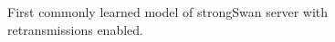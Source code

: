 \begin{figure}[ht]
	\vspace*{\fill}
	\noindent
	\hspace*{-5.5\oddsidemargin}%
	\caption{First commonly learned model of strongSwan server with retransmissions enabled.}
	\label{fig:ret_case1}
	\vspace*{\fill}
\end{figure}

